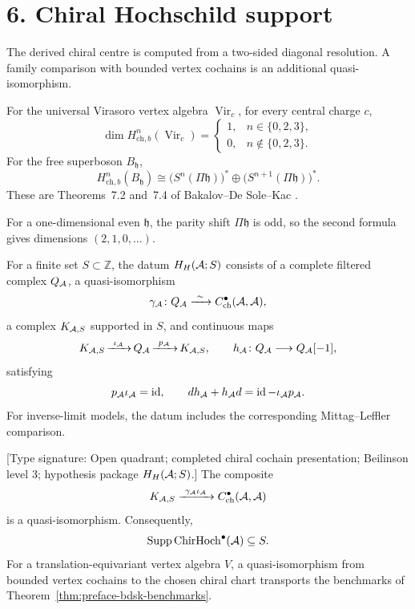 \section*{6.  Chiral Hochschild support}

The derived chiral centre is computed from a two-sided diagonal
resolution.  A family comparison with bounded vertex cochains is an
additional quasi-isomorphism.

\begin{theorem}
\label{thm:preface-bdsk-benchmarks}
For the universal Virasoro vertex algebra
\(\operatorname{Vir}_c\), for every central charge \(c\),
\[
 \dim H^n_{\mathrm{ch},b}(\operatorname{Vir}_c)
 =
 \begin{cases}
 1,&n\in\{0,2,3\},\\
 0,&n\notin\{0,2,3\}.
 \end{cases}
\]
For the free superboson \(B_{\mathfrak h}\),
\[
 H^n_{\mathrm{ch},b}(B_{\mathfrak h})
 \cong
 \bigl(S^n(\Pi\mathfrak h)\bigr)^*
 \oplus
 \bigl(S^{n+1}(\Pi\mathfrak h)\bigr)^*.
\]
These are Theorems~7.2 and~7.4 of
Bakalov--De Sole--Kac
\cite{BDSK21}.
\end{theorem}

For a one-dimensional even \(\mathfrak h\), the parity shift
\(\Pi\mathfrak h\) is odd, so the second formula gives dimensions
\((2,1,0,\ldots)\).

\begin{definition}
\label{def:preface-family-support}
For a finite set \(S\subset\mathbb Z\), the datum
\(H_H(\mathcal{A};S)\) consists of a complete filtered complex
\(Q_{\mathcal{A}}\), a quasi-isomorphism
\[
 \gamma_{\mathcal{A}}\colon Q_{\mathcal{A}}
 \xrightarrow{\ \sim\ }
 C^\bullet_{\mathrm{ch}}(\mathcal{A},\mathcal{A}),
\]
a complex \(K_{\mathcal{A},S}\) supported in \(S\), and continuous maps
\[
 K_{\mathcal{A},S}
 \mathop{\xrightarrow{\ \iota_{\mathcal{A}}\ }}Q_{\mathcal{A}}
 \mathop{\xrightarrow{\ p_{\mathcal{A}}\ }}K_{\mathcal{A},S},
 \qquad
 h_{\mathcal{A}}\colon Q_{\mathcal{A}}\longrightarrow Q_{\mathcal{A}}[-1],
\]
satisfying
\[
 p_{\mathcal{A}}\iota_{\mathcal{A}}=\operatorname{id},\qquad
 d h_{\mathcal{A}}+h_{\mathcal{A}}d
 =\operatorname{id}-\iota_{\mathcal{A}}p_{\mathcal{A}}.
\]
For inverse-limit models, the datum includes the corresponding
Mittag--Leffler comparison.
\end{definition}

\begin{theorem}
\label{thm:preface-theorem-h}
\textup{[Type signature: Open quadrant; completed chiral cochain
presentation; Beilinson level \(3\); hypothesis package
\(H_H(\mathcal{A};S)\).]}
The composite
\[
 K_{\cA,S}\xrightarrow{\ \gamma_{\cA}\iota_{\cA}\ }
 C^\bullet_{\mathrm{ch}}(\cA,\cA)
\]
is a quasi-isomorphism.  Consequently,
\[
 \operatorname{Supp}
 \operatorname{ChirHoch}^{\bullet}(\mathcal{A})\subseteq S.
\]
For a translation-equivariant vertex algebra \(V\), a
quasi-isomorphism from bounded vertex cochains to the chosen chiral
chart transports the benchmarks of
Theorem~\ref{thm:preface-bdsk-benchmarks}.
\end{theorem}

